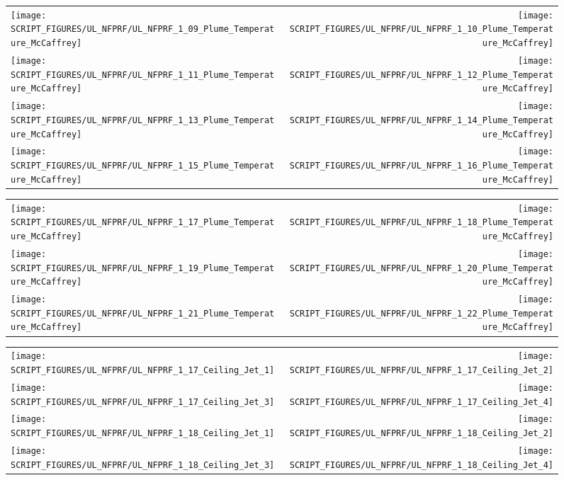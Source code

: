 \begin{figure}[p]
\begin{tabular*}{\textwidth}{l@{\extracolsep{\fill}}r}
\texttt{[image: SCRIPT\_FIGURES/UL\_NFPRF/UL\_NFPRF\_1\_09\_Plume\_Temperature\_McCaffrey]} &
\texttt{[image: SCRIPT\_FIGURES/UL\_NFPRF/UL\_NFPRF\_1\_10\_Plume\_Temperature\_McCaffrey]} \\
\texttt{[image: SCRIPT\_FIGURES/UL\_NFPRF/UL\_NFPRF\_1\_11\_Plume\_Temperature\_McCaffrey]} &
\texttt{[image: SCRIPT\_FIGURES/UL\_NFPRF/UL\_NFPRF\_1\_12\_Plume\_Temperature\_McCaffrey]} \\
\texttt{[image: SCRIPT\_FIGURES/UL\_NFPRF/UL\_NFPRF\_1\_13\_Plume\_Temperature\_McCaffrey]} &
\texttt{[image: SCRIPT\_FIGURES/UL\_NFPRF/UL\_NFPRF\_1\_14\_Plume\_Temperature\_McCaffrey]} \\
\texttt{[image: SCRIPT\_FIGURES/UL\_NFPRF/UL\_NFPRF\_1\_15\_Plume\_Temperature\_McCaffrey]} &
\texttt{[image: SCRIPT\_FIGURES/UL\_NFPRF/UL\_NFPRF\_1\_16\_Plume\_Temperature\_McCaffrey]}
\end{tabular*}
\end{figure}

\begin{figure}[p]
\begin{tabular*}{\textwidth}{l@{\extracolsep{\fill}}r}
\texttt{[image: SCRIPT\_FIGURES/UL\_NFPRF/UL\_NFPRF\_1\_17\_Plume\_Temperature\_McCaffrey]} &
\texttt{[image: SCRIPT\_FIGURES/UL\_NFPRF/UL\_NFPRF\_1\_18\_Plume\_Temperature\_McCaffrey]} \\
\texttt{[image: SCRIPT\_FIGURES/UL\_NFPRF/UL\_NFPRF\_1\_19\_Plume\_Temperature\_McCaffrey]} &
\texttt{[image: SCRIPT\_FIGURES/UL\_NFPRF/UL\_NFPRF\_1\_20\_Plume\_Temperature\_McCaffrey]} \\
\texttt{[image: SCRIPT\_FIGURES/UL\_NFPRF/UL\_NFPRF\_1\_21\_Plume\_Temperature\_McCaffrey]} &
\texttt{[image: SCRIPT\_FIGURES/UL\_NFPRF/UL\_NFPRF\_1\_22\_Plume\_Temperature\_McCaffrey]}
\end{tabular*}
\end{figure}

\begin{figure}[p]
\begin{tabular*}{\textwidth}{l@{\extracolsep{\fill}}r}
\texttt{[image: SCRIPT\_FIGURES/UL\_NFPRF/UL\_NFPRF\_1\_17\_Ceiling\_Jet\_1]} &
\texttt{[image: SCRIPT\_FIGURES/UL\_NFPRF/UL\_NFPRF\_1\_17\_Ceiling\_Jet\_2]} \\
\texttt{[image: SCRIPT\_FIGURES/UL\_NFPRF/UL\_NFPRF\_1\_17\_Ceiling\_Jet\_3]} &
\texttt{[image: SCRIPT\_FIGURES/UL\_NFPRF/UL\_NFPRF\_1\_17\_Ceiling\_Jet\_4]} \\
\texttt{[image: SCRIPT\_FIGURES/UL\_NFPRF/UL\_NFPRF\_1\_18\_Ceiling\_Jet\_1]} &
\texttt{[image: SCRIPT\_FIGURES/UL\_NFPRF/UL\_NFPRF\_1\_18\_Ceiling\_Jet\_2]} \\
\texttt{[image: SCRIPT\_FIGURES/UL\_NFPRF/UL\_NFPRF\_1\_18\_Ceiling\_Jet\_3]} &
\texttt{[image: SCRIPT\_FIGURES/UL\_NFPRF/UL\_NFPRF\_1\_18\_Ceiling\_Jet\_4]}
\end{tabular*}
\end{figure}

